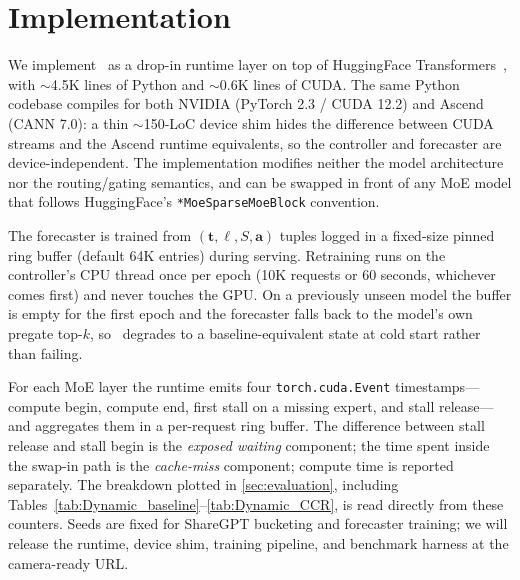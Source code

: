 \section{Implementation}
\label{sec:implementation}

We implement \systemname\ as a drop-in runtime layer on top of HuggingFace
Transformers~\cite{wolf2020transformers}, with $\sim$4.5K lines of Python
and $\sim$0.6K lines of CUDA. The same Python codebase compiles for both
NVIDIA (PyTorch 2.3 / CUDA 12.2) and Ascend (CANN 7.0): a thin $\sim$150-LoC
device shim hides the difference between CUDA streams and the Ascend runtime
equivalents, so the controller and forecaster are device-independent. The
implementation modifies neither the model architecture nor the routing/gating
semantics, and can be swapped in front of any MoE model that follows
HuggingFace's \texttt{*MoeSparseMoeBlock} convention.

The forecaster is trained from $(\mathbf{t}, \ell, S, \mathbf{a})$ tuples
logged in a fixed-size pinned ring buffer (default 64K entries) during
serving. Retraining runs on the controller's CPU thread once per epoch
(10K requests or 60 seconds, whichever comes first) and never touches the
GPU. On a previously unseen model the buffer is empty for the first epoch
and the forecaster falls back to the model's own pregate top-$k$, so
\systemname\ degrades to a baseline-equivalent state at cold start rather
than failing.

For each MoE layer the runtime emits four \texttt{torch.cuda.Event}
timestamps---compute begin, compute end, first stall on a missing expert,
and stall release---and aggregates them in a per-request ring buffer. The
difference between stall release and stall begin is the \emph{exposed
waiting} component; the time spent inside the swap-in path is the
\emph{cache-miss} component; compute time is reported separately. The
breakdown plotted in \autoref{sec:evaluation}, including
Tables~\ref{tab:Dynamic_baseline}--\ref{tab:Dynamic_CCR}, is read directly
from these counters. Seeds are fixed for ShareGPT bucketing and forecaster
training; we will release the runtime, device shim, training pipeline, and
benchmark harness at the camera-ready URL.
